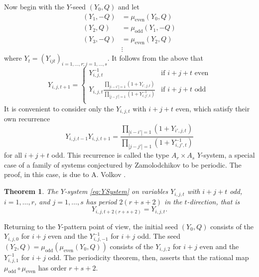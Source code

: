 \documentclass{amsart}
\newtheorem{theorem}{Theorem}[section]
\theoremstyle{definition}
\theoremstyle{remark}
\numberwithin{equation}{section}
\begin{document}
	Now begin with the $Y$-seed $(Y_0,Q)$ and let 
	\begin{align*}
	(Y_1,-Q) &= \mu_{\textrm{even}}(Y_0,Q) \\ 
	(Y_2,Q) &= \mu_{\textrm{odd}}(Y_1,-Q) \\ 
	(Y_3,-Q) &= \mu_{\textrm{even}}(Y_2,Q) \\ 
	&\vdots
	\end{align*}
	where $Y_t = (Y_{ijt})_{i=1,\ldots, r; j=1,\ldots, s}$.  It follows from the above that
	\begin{displaymath}
		Y_{i,j,t+1} = \begin{cases}
		Y_{i,j,t}^{-1} & \textrm{if $i+j+t$ even} \\
		Y_{i,j,t}\frac{\displaystyle\prod_{|i-i'|=1}(1+Y_{i',j,t})}{\displaystyle\prod_{|j-j'|=1}(1+Y_{i,j',t}^{-1})} & \textrm{if $i+j+t$ odd} \\
		\end{cases}
	\end{displaymath}
	It is convenient to consider only the $Y_{i,j,t}$ with $i+j+t$ even, which satisfy their own recurrence
	\begin{equation} \label{eq:YSystem}
		Y_{i,j,t-1}Y_{i,j,t+1} = \frac{\displaystyle\prod_{|i-i'|=1}(1+Y_{i',j,t})}{\displaystyle\prod_{|j-j'|=1}(1+Y_{i,j',t}^{-1})}
	\end{equation}
	for all $i+j+t$ odd.  This recurrence is called the type $A_r \times A_s$ $Y$-system, a special case of a family of systems conjectured by Zamolodchikov to be periodic.  The proof, in this case, is due to A. Volkov \cite{V07}.
	
	\begin{theorem}
		The $Y$-system \eqref{eq:YSystem} on variables $Y_{i,j,t}$ with $i+j+t$ odd, $i=1,\ldots, r$, and $j=1,\ldots, s$ has period $2(r+s+2)$ in the $t$-direction, that is
		\begin{displaymath}
			Y_{i,j,t+2(r+s+2)} = Y_{i,j,t}.
		\end{displaymath}
	\end{theorem}
	
	Returning to the $Y$-pattern point of view, the initial seed $(Y_0,Q)$ consists of the $Y_{i,j,0}$ for $i+j$ even and the $Y_{i,j,-1}^{-1}$ for $i+j$ odd.  The seed $(Y_2,Q) = \mu_{\textrm{odd}}(\mu_{\textrm{even}}(Y_0,Q))$ consists of the $Y_{i,j,2}$ for $i+j$ even and the $Y_{i,j,1}^{-1}$ for $i+j$ odd.  The periodicity theorem, then, asserts that the rational map $\mu_{\textrm{odd}} \circ \mu_{\textrm{even}}$ has order $r+s+2$.
	
\end{document}
